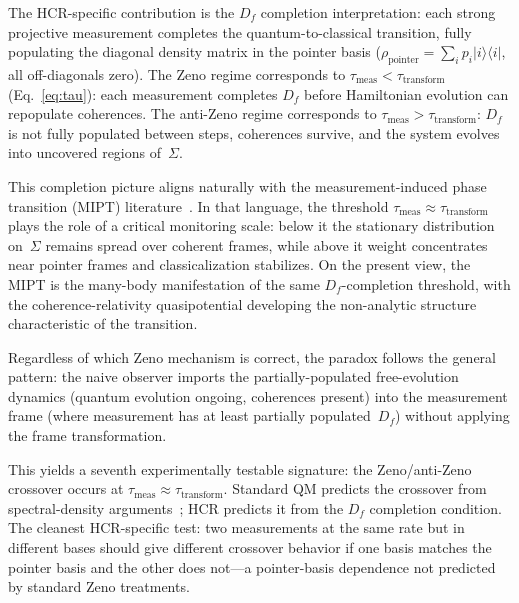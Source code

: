 \documentclass[aps,prd,twocolumn,superscriptaddress,nofootinbib,floatfix]{revtex4-2}
\newcommand{\Sig}{\Sigma}
\newcommand{\HCR}{HCR}
\newcommand{\CR}{\HCR}  %
\begin{document}
The \CR{}-specific contribution is the $D_f$ completion interpretation: each strong projective measurement completes the quantum-to-classical transition, fully populating the diagonal density matrix in the pointer basis ($\rho_{\mathrm{pointer}} = \sum_i p_i |i\rangle\langle i|$, all off-diagonals zero). The Zeno regime corresponds to $\tau_{\mathrm{meas}} < \tau_{\mathrm{transform}}$ (Eq.~\ref{eq:tau}): each measurement completes $D_f$ before Hamiltonian evolution can repopulate coherences. The anti-Zeno regime corresponds to $\tau_{\mathrm{meas}} > \tau_{\mathrm{transform}}$: $D_f$ is not fully populated between steps, coherences survive, and the system evolves into uncovered regions of~$\Sig$.

This completion picture aligns naturally with the measurement-induced phase transition (MIPT) literature~\cite{Li2019MIPT,Bao2020MIPT,Noel2022MIPT,GoogleMIPT2023}. In that language, the threshold $\tau_{\mathrm{meas}} \approx \tau_{\mathrm{transform}}$ plays the role of a critical monitoring scale: below it the stationary distribution on~$\Sig$ remains spread over coherent frames, while above it weight concentrates near pointer frames and classicalization stabilizes. On the present view, the MIPT is the many-body manifestation of the same $D_f$-completion threshold, with the coherence-relativity quasipotential developing the non-analytic structure characteristic of the transition.

Regardless of which Zeno mechanism is correct, the paradox follows the general pattern: the naive observer imports the partially-populated free-evolution dynamics (quantum evolution ongoing, coherences present) into the measurement frame (where measurement has at least partially populated~$D_f$) without applying the frame transformation.

This yields a seventh experimentally testable signature: the Zeno/anti-Zeno crossover occurs at $\tau_{\mathrm{meas}} \approx \tau_{\mathrm{transform}}$. Standard QM predicts the crossover from spectral-density arguments~\cite{KofmanKurizki2000}; \CR{} predicts it from the $D_f$ completion condition. The cleanest \CR{}-specific test: two measurements at the same rate but in different bases should give different crossover behavior if one basis matches the pointer basis and the other does not---a pointer-basis dependence not predicted by standard Zeno treatments.
\end{document}
